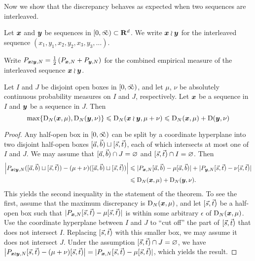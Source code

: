 Now we show that the discrepancy behaves as expected when two sequences are 
interleaved. 

\begin{definition}
Let ${\boldsymbol x}$ and ${\boldsymbol y}$ be sequences in $[0,\vec{\infty})\subset \mathbf{R}^d$. We write 
${\boldsymbol x}\wr{\boldsymbol y}$ for the interleaved sequence $(x_1,y_1,x_2,y_2,x_3,y_3,\dots)$. 
\end{definition}

Write 
$P_{{\boldsymbol x}\wr{\boldsymbol y},N} = \frac{1}{2} \left( P_{{\boldsymbol x},N} + P_{{\boldsymbol y},N}\right)$ for the 
combined empirical measure of the interleaved sequence ${\boldsymbol x}\wr{\boldsymbol y}$. 

\begin{theorem}\label{thm:wreath-seq}
Let $I$ and $J$ be disjoint open boxes in $[0,\vec{\infty})$, and let $\mu$, 
$\nu$ be absolutely continuous probability measures on $I$ and $J$, 
respectively. Let ${\boldsymbol x}$ be a sequence in $I$ and ${\boldsymbol y}$ be a sequence in $J$. 
Then 
\[
	\max\{\operatorname{D}_N({\boldsymbol x},\mu),\operatorname{D}_N({\boldsymbol y},\nu)\} \leqslant \operatorname{D}_N({\boldsymbol x}\wr{\boldsymbol y}, \mu+\nu) \leqslant \operatorname{D}_N({\boldsymbol x},\mu) + \operatorname{D}({\boldsymbol y},\nu)
\]
\end{theorem}
\begin{proof}
Any half-open box in $[0,\vec{\infty})$ can be split by a coordinate 
hyperplane into two disjoint half-open boxes $[\vec{a},\vec{b})\sqcup [\vec{s},\vec{t})$, each 
of which intersects at most one of $I$ and $J$. We may assume that 
$[\vec{a},\vec{b})\cap J=\varnothing$ and $[\vec{s},\vec{t})\cap I = \varnothing$. Then 
\begin{align*}
	\left| P_{{\boldsymbol x}\wr{\boldsymbol y},N}([\vec{a},\vec{b})\sqcup [\vec{s},\vec{t})) - (\mu+\nu)([\vec{a},\vec{b})\sqcup[\vec{s},\vec{t}))\right| 
		&\leqslant |P_{{\boldsymbol x},N}[\vec{a},\vec{b}) - \mu[\vec{a},\vec{b})| + |P_{{\boldsymbol y},N}[\vec{s},\vec{t}) - \nu[\vec{s},\vec{t})| \\
		&\leqslant \operatorname{D}_N({\boldsymbol x},\mu) + \operatorname{D}_N({\boldsymbol y},\nu) .
\end{align*}
This yields the second inequality in the statement of the theorem. To see the 
first, assume that the maximum discrepancy is $\operatorname{D}_N({\boldsymbol x},\mu)$, and let 
$[\vec{s},\vec{t})$ be a half-open box such that $|P_{{\boldsymbol x},N}[\vec{s},\vec{t}) - \mu[\vec{s},\vec{t})|$ 
is within some arbitrary $\epsilon$ of $\operatorname{D}_N({\boldsymbol x},\mu)$. Use the coordinate 
hyperplane between $I$ and $J$ to ``cut off'' the part of $[\vec{s},\vec{t})$ that 
does not intersect $I$. Replacing $[\vec{s},\vec{t})$ with this smaller box, we may 
assume it does not intersect $J$. Under the assumption  
$[\vec{s},\vec{t})\cap J=\varnothing$, we have
$\left|P_{{\boldsymbol x}\wr{\boldsymbol y},N}[\vec{s},\vec{t}) - (\mu+\nu)[\vec{s},\vec{t})\right| = |P_{{\boldsymbol x},N}[\vec{s},\vec{t}) - \mu[\vec{s},\vec{t})|$, 
which yields the result. 
\end{proof}





